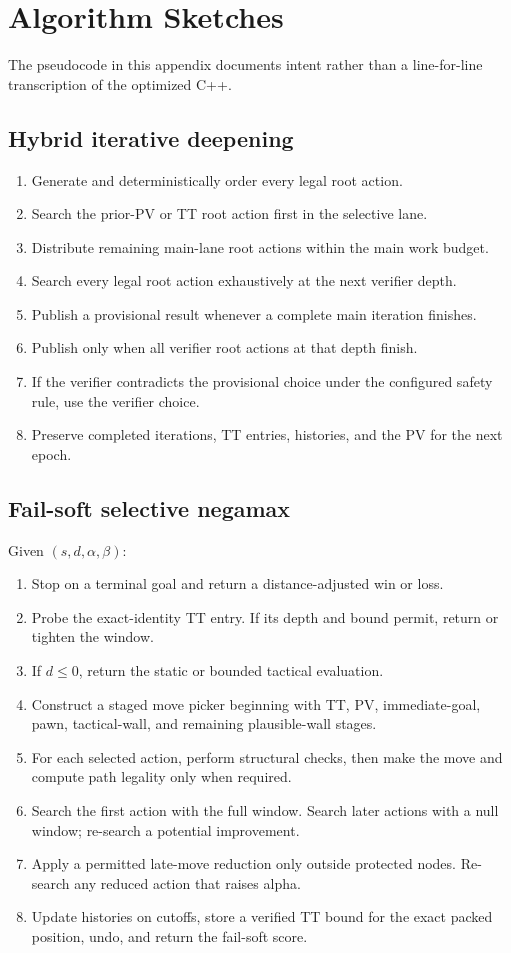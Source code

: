 \section{Algorithm Sketches}
The pseudocode in this appendix documents intent rather than a line-for-line transcription of the optimized C++.

\subsection{Hybrid iterative deepening}
\begin{enumerate}
\item Generate and deterministically order every legal root action.
\item Search the prior-PV or TT root action first in the selective lane.
\item Distribute remaining main-lane root actions within the main work budget.
\item Search every legal root action exhaustively at the next verifier depth.
\item Publish a provisional result whenever a complete main iteration finishes.
\item Publish \verifiedDepth{} only when all verifier root actions at that depth finish.
\item If the verifier contradicts the provisional choice under the configured safety rule, use the verifier choice.
\item Preserve completed iterations, TT entries, histories, and the PV for the next epoch.
\end{enumerate}

\subsection{Fail-soft selective negamax}
Given $(s,d,\alpha,\beta)$:
\begin{enumerate}
\item Stop on a terminal goal and return a distance-adjusted win or loss.
\item Probe the exact-identity TT entry. If its depth and bound permit, return or tighten the window.
\item If $d\leq0$, return the static or bounded tactical evaluation.
\item Construct a staged move picker beginning with TT, PV, immediate-goal, pawn, tactical-wall, and remaining plausible-wall stages.
\item For each selected action, perform structural checks, then make the move and compute path legality only when required.
\item Search the first action with the full window. Search later actions with a null window; re-search a potential improvement.
\item Apply a permitted late-move reduction only outside protected nodes. Re-search any reduced action that raises alpha.
\item Update histories on cutoffs, store a verified TT bound for the exact packed position, undo, and return the fail-soft score.
\end{enumerate}

